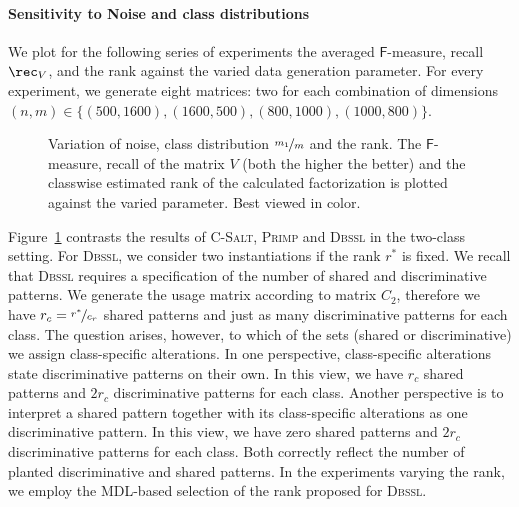 \paragraph{Sensitivity to Noise and class distributions}
We plot for the following series of experiments the averaged $\mathsf{F}$-measure, recall $\rec_V$, and the rank against the varied data generation parameter. For every experiment, we generate eight matrices: two for each combination of dimensions $(n,m)\in\{(500,1600),\allowbreak(1600,500),\allowbreak(800,1000),\allowbreak(1000,800)\}$.
\begin{figure}[t!]
\centering

\caption{Variation of noise, class distribution $\nicefrac{m_1}{m}$  and the rank. The $\mathsf{F}$-measure, recall of the matrix $V$ (both the higher the better) and the classwise estimated rank of the calculated factorization is plotted against the varied parameter. Best viewed in color.}
\label{fig:CS:noise}
\end{figure}

Figure~\ref{fig:CS:noise} contrasts the results of \textsc{C-Salt}, \textsc{Primp} and \textsc{Dbssl} in the two-class setting. For \textsc{Dbssl}, we consider two instantiations if the rank $r^*$ is fixed. We recall that \textsc{Dbssl} requires a specification of the number of shared and discriminative patterns. We generate the usage matrix according to matrix $C_2$, therefore we have $r_c=\nicefrac{r^*}{c_r}$ shared patterns and just as many discriminative patterns for each class. The question arises, however, to which of the sets (shared or discriminative) we assign class-specific alterations. In one perspective, class-specific alterations state discriminative patterns on their own. In this view, we have $r_c$ shared patterns and $2r_c$ discriminative patterns for each class. Another perspective is to interpret a shared pattern together with its class-specific alterations as one discriminative pattern. In this view, we have zero shared patterns and $2r_c$ discriminative patterns for each class. Both correctly reflect the number of planted discriminative and shared patterns. In the experiments varying the rank, we employ the MDL-based selection of the rank proposed for \textsc{Dbssl}. %

